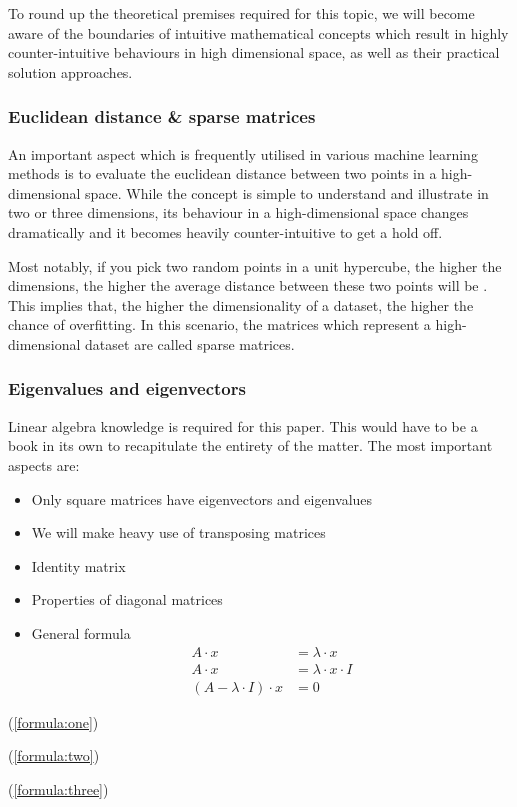 
To round up the theoretical premises required for this topic, we will become aware of the boundaries of intuitive mathematical concepts which result in highly counter-intuitive behaviours in high dimensional space, as well as their practical solution approaches.

\subsubsection{Euclidean distance \& sparse matrices}

An important aspect which is frequently utilised in various machine learning methods is to evaluate the euclidean distance between two points in a high-dimensional space.
While the concept is simple to understand and illustrate in two or three dimensions, its behaviour in a high-dimensional space changes dramatically and it becomes heavily counter-intuitive to get a hold off.

Most notably, if you pick two random points in a unit hypercube, the higher the dimensions, the higher the average distance between these two points will be \cite{HandsOnMLCh8}.
This implies that, the higher the dimensionality of a dataset, the higher the chance of overfitting.
In this scenario, the matrices which represent a high-dimensional dataset are called sparse matrices.

\vspace{2mm}



\subsubsection{Eigenvalues and eigenvectors}

Linear algebra knowledge is required for this paper.
This would have to be a book in its own to recapitulate the entirety of the matter.
The most important aspects are:

\begin{itemize}
	\item Only square matrices have eigenvectors and eigenvalues
	\item We will make heavy use of transposing matrices
	\item Identity matrix
	\item Properties of diagonal matrices
	\item General formula
	\begin{align}
		\label{formula:one}
		A \cdot x &= \lambda \cdot x 
		\\
		\label{formula:two}
		A \cdot x &= \lambda \cdot x \cdot I
		\\
		\label{formula:three}
		(A - \lambda \cdot I)\cdot x &= 0
	\end{align}
\end{itemize}

(\ref{formula:one})

(\ref{formula:two})

(\ref{formula:three})
